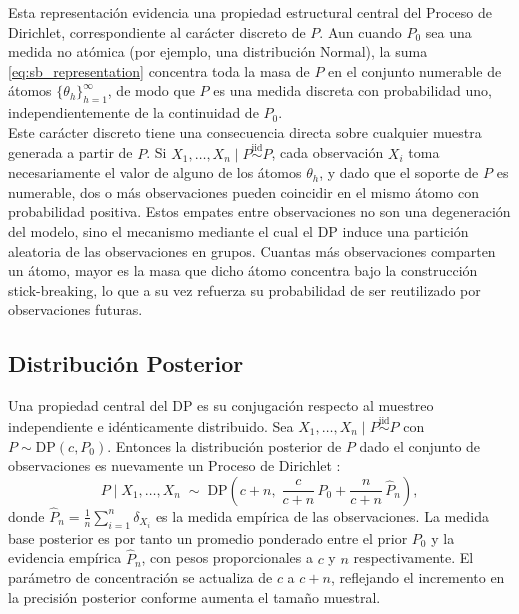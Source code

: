 Esta representación evidencia una propiedad estructural central del Proceso de Dirichlet, correspondiente al carácter discreto de $P$. Aun cuando $P_0$ sea una medida no atómica (por ejemplo, una distribución Normal), la suma \eqref{eq:sb_representation} concentra toda la masa de $P$ en el conjunto numerable de átomos $\{\theta_h\}_{h=1}^{\infty}$, de modo que $P$ es una medida discreta con probabilidad uno, independientemente de la continuidad de $P_0$.\\

Este carácter discreto tiene una consecuencia directa sobre cualquier muestra generada a partir de $P$. Si $X_1, \dots, X_n \mid P \overset{\mathrm{iid}}{\sim} P$, cada observación $X_i$ toma necesariamente el valor de alguno de los átomos $\theta_h$, y dado que el soporte de $P$ es numerable, dos o más observaciones pueden coincidir en el mismo átomo con probabilidad positiva. Estos empates entre observaciones no son una degeneración del modelo, sino el mecanismo mediante el cual el DP induce una partición aleatoria de las observaciones en grupos. Cuantas más observaciones comparten un átomo, mayor es la masa que dicho átomo concentra bajo la construcción stick-breaking, lo que a su vez refuerza su probabilidad de ser reutilizado por observaciones futuras. 

\subsection{Distribución Posterior}
\label{02_04_03_posterior_dp}
Una propiedad central del DP es su conjugación respecto al muestreo independiente e idénticamente distribuido. Sea $X_1, \dots, X_n \mid P \overset{\mathrm{iid}}{\sim} P$ con $P \sim \mathrm{DP}(c, P_0)$. Entonces la distribución posterior de $P$ dado el conjunto de observaciones es nuevamente un Proceso de Dirichlet \citep{02_04_muller2015bayesian}:
\begin{equation}\label{eq:dp_posterior}
    P \mid X_1, \dots, X_n \;\sim\;
    \mathrm{DP}\!\left(c + n,\;\frac{c}{c+n}\,P_0
    + \frac{n}{c+n}\,\widehat{P}_n\right),
\end{equation}
donde $\widehat{P}_n = \frac{1}{n}\sum_{i=1}^n \delta_{X_i}$ es la medida empírica de las observaciones. La medida base posterior es por tanto un promedio ponderado entre el prior $P_0$ y la evidencia empírica $\widehat{P}_n$, con pesos proporcionales a $c$ y $n$ respectivamente. El parámetro de concentración se actualiza de $c$ a $c + n$, reflejando el incremento en la precisión posterior conforme aumenta el tamaño muestral.\\

